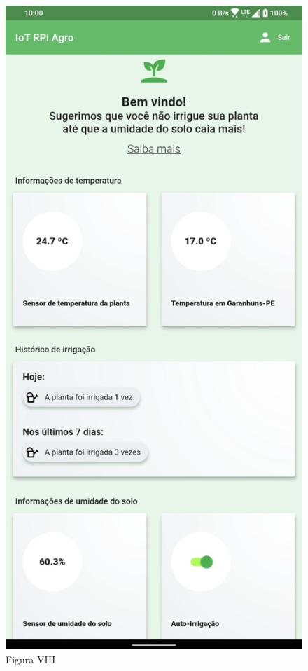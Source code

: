 \documentclass[eso]{bcc}
\begin{document}
\begin{figure}[htbp]
\centerline{\includegraphics[scale=.25]{Figuras/figura-viii.jpg}}
\caption{Figura VIII}\label{fig-viii}
\end{figure}
\end{document}
